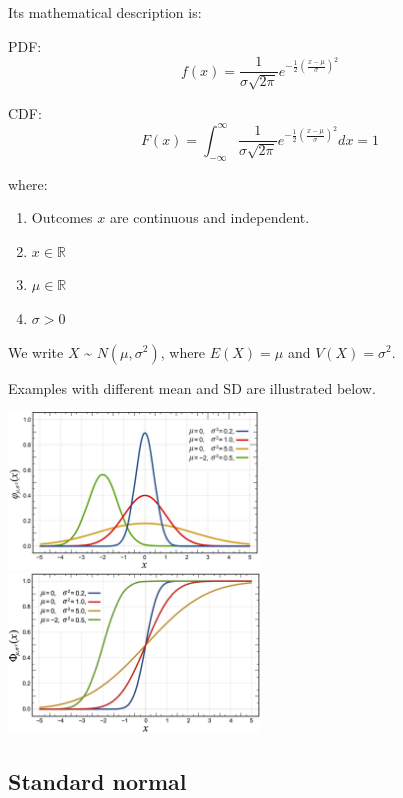 \documentclass[
]{article}
\providecommand{\tightlist}{%
  \setlength{\itemsep}{0pt}\setlength{\parskip}{0pt}}
\begin{document}
Its mathematical description is:

PDF: \[ f(x) = \frac{1}{\sigma\sqrt{2\pi}} e^{-\frac{1}{2} 
               \left(\frac{x-\mu}{\sigma}\right)^2} \]

CDF: \[ F(x) = \int_{-\infty}^{\infty}
               \frac{1}{\sigma\sqrt{2\pi}} e^{-\frac{1}{2} 
               \left(\frac{x-\mu}{\sigma}\right)^2}dx = 1 \]

where:

\begin{enumerate}
\def\labelenumi{\arabic{enumi}.}
\tightlist
\item
  Outcomes \(x\) are continuous and independent.
\item
  \(x \in \mathbb{R}\)
\item
  \(\mu \in \mathbb{R}\)
\item
  \(\sigma > 0\)
\end{enumerate}

We write \(X\) \textasciitilde{} \(N(\mu,\sigma^2)\), where
\(E(X) = \mu\) and \(V(X) = \sigma^2\).

Examples with different mean and SD are illustrated below.

\includegraphics[width=0.5\textwidth,height=\textheight]{Images/Normal_Distribution_PDF.png}
\includegraphics[width=0.5\textwidth,height=\textheight]{Images/Normal_Distribution_CDF.png}

\hypertarget{standard-normal}{%
\subsection{Standard normal}\label{standard-normal}}
\end{document}
